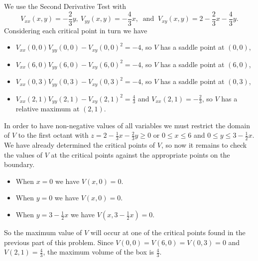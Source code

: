 \begin{exercises}
\begin{exerciseSolution}
	\item We use the Second Derivative Test with 
\[V_{xx}(x,y) = -\frac{2}{3}y, \ V_{yy}(x,y) = -\frac{4}{3}x, \ \text{ and } \ V_{xy}(x,y) = 2-\frac{2}{3}x - \frac{4}{3}y.\]
Considering each critical point in turn we have 
\begin{itemize}
\item $V_{xx}(0,0)V_{yy}(0,0) - V_{xy}(0,0)^2= -4$, so $V$ has a saddle point at $(0,0)$,
\item $V_{xx}(6,0)V_{yy}(6,0) - V_{xy}(6,0)^2= -4$, so $V$ has a saddle point at $(6,0)$,
\item $V_{xx}(0,3)V_{yy}(0,3) - V_{xy}(0,3)^2= -4$, so $V$ has a saddle point at $(0,3)$,
\item $V_{xx}(2,1)V_{yy}(2,1) - V_{xy}(2,1)^2= \frac{4}{3}$ and $V_{xx}(2,1) = -\frac{2}{3}$, so $V$ has a relative maximum at $(2,1)$.
\end{itemize}

	\item In order to have non-negative values of all variables we must restrict the domain of $V$ to the first octant with $z=2-\frac{1}{3}x-\frac{2}{3}y \geq 0$ or $0 \leq x \leq 6$ and $0 \leq y \leq 3-\frac{1}{2}x$. We have already determined the critical points of $V$, so now it remains to check the values of $V$ at the critical points against the appropriate points on the boundary. 
\begin{itemize}
\item When $x=0$ we have $V(x,0) = 0$. 
\item When $y=0$ we have $V(x,0) = 0$. 
\item When $y = 3 - \frac{1}{2}x$ we have $V\left(x,3-\frac{1}{2}x\right) = 0$.
\end{itemize}
So the maximum value of $V$ will occur at one of the critical points found in the previous part of this problem. Since $V(0,0) = V(6,0) = V(0,3) = 0$ and $V(2,1) = \frac{4}{3}$, the maximum volume of the box is $\frac{4}{3}$. 
 

\end{exerciseSolution}
\end{exercises}
